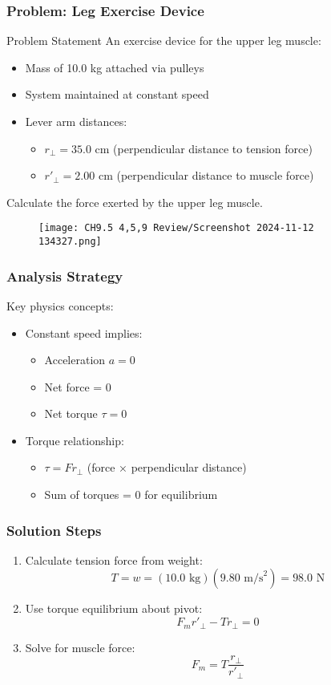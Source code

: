 \documentclass{beamer}
\begin{document}
\begin{frame}
\frametitle{Problem: Leg Exercise Device}
\begin{block}{Problem Statement}
An exercise device for the upper leg muscle:
\begin{itemize}
    \item Mass of 10.0 kg attached via pulleys
    \item System maintained at constant speed
    \item Lever arm distances:
    \begin{itemize}
        \item $r_\perp = 35.0$ cm (perpendicular distance to tension force)
        \item $r'_\perp = 2.00$ cm (perpendicular distance to muscle force)
    \end{itemize}
\end{itemize}
Calculate the force exerted by the upper leg muscle.
\end{block}
\begin{figure}
    \centering
    \texttt{[image: CH9.5 4,5,9 Review/Screenshot 2024-11-12 134327.png]}
\end{figure}
\end{frame}

\begin{frame}
\frametitle{Analysis Strategy}
Key physics concepts:
\begin{itemize}
    \item Constant speed implies:
    \begin{itemize}
        \item Acceleration $a = 0$
        \item Net force = 0
        \item Net torque $\tau = 0$
    \end{itemize}
    \item Torque relationship:
    \begin{itemize}
        \item $\tau = F r_\perp$ (force × perpendicular distance)
        \item Sum of torques = 0 for equilibrium
    \end{itemize}
\end{itemize}
\end{frame}

\begin{frame}
\frametitle{Solution Steps}
\begin{enumerate}
    \item Calculate tension force from weight:
    \[T = w = (10.0\text{ kg})(9.80\text{ m/s}^2) = 98.0\text{ N}\]
    \item Use torque equilibrium about pivot:
    \[F_m r'_\perp - T r_\perp = 0\]
    \item Solve for muscle force:
    \[F_m = T\frac{r_\perp}{r'_\perp}\]
\end{enumerate}
\end{frame}
\end{document}
